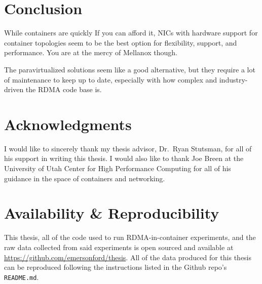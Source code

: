\documentclass[12pt,titlepage]{article}
\begin{document}
\section{Conclusion}
While containers are quickly 
If you can afford it, NICs with hardware support for container topologies seem to be the best option for flexibility, support, and performance.
You are at the mercy of Mellanox though.

The paravirtualized solutions seem like a good alternative, but they require a lot of maintenance to keep up to date, especially with how complex and industry-driven the RDMA code base is.



\section{Acknowledgments}
I would like to sincerely thank my thesis advisor, Dr.\ Ryan Stutsman, for all of his support in writing this thesis.
I would also like to thank Joe Breen at the University of Utah Center for High Performance Computing for all of his guidance in the space of containers and networking.

\section{Availability \& Reproducibility}
This thesis, all of the code used to run RDMA-in-container experiments, and the raw data collected from said experiments is open sourced and available at \newline\href{https://github.com/emersonford/thesis}{https://github.com/emersonford/thesis}.
All of the data produced for this thesis can be reproduced following the instructions listed in the Github repo's \texttt{README.md}.
\end{document}
